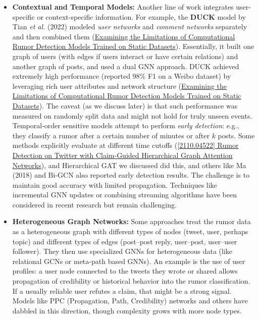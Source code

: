 \documentclass[12pt,a4paper]{report}
\begin{document}
\begin{itemize}[leftmargin=1.2cm]
    \item \textbf{Contextual and Temporal Models:} Another line of work integrates user-specific or context-specific information. For example, the \textbf{DUCK} model by Tian \textit{et al.} (2022) modeled \textit{user networks} and \textit{comment networks} separately and then combined them (\href{https://arxiv.org/html/2309.11576v2#:~:text=DUCK%3A%20Rumour%20detection%20on%20social,Association%20for}{Examining the Limitations of Computational Rumor Detection Models Trained on Static Datasets}). Essentially, it built one graph of users (with edges if users interact or have certain relations) and another graph of posts, and used a dual GNN approach. DUCK achieved extremely high performance (reported 98\% F1 on a Weibo dataset) by leveraging rich user attributes and network structure (\href{https://arxiv.org/html/2309.11576v2#:~:text=Recent%20hybrid%20models%20began%20including,Ma}{Examining the Limitations of Computational Rumor Detection Models Trained on Static Datasets}). The caveat (as we discuss later) is that such performance was measured on randomly split data and might not hold for truly unseen events. Temporal-order sensitive models attempt to perform \textit{early detection}: e.g., they classify a rumor after a certain number of minutes or after \(k\) posts. Some methods explicitly evaluate at different time cutoffs (\href{https://ar5iv.org/pdf/2110.04522#:~:text=5}{[2110.04522] Rumor Detection on Twitter with Claim-Guided Hierarchical Graph Attention Networks}), and Hierarchical GAT we discussed did this, and others like Ma (2018) and Bi-GCN also reported early detection results. The challenge is to maintain good accuracy with limited propagation. Techniques like incremental GNN updates or combining streaming algorithms have been considered in recent research but remain challenging.
    \item \textbf{Heterogeneous Graph Networks:} Some approaches treat the rumor data as a heterogeneous graph with different types of nodes (tweet, user, perhaps topic) and different types of edges (post–post reply, user–post, user–user follower). They then use specialized GNNs for heterogeneous data (like relational GCNs or meta-path based GNNs). An example is the use of user profiles: a user node connected to the tweets they wrote or shared allows propagation of credibility or historical behavior into the rumor classification. If a usually reliable user refutes a claim, that might be a strong signal. Models like PPC (Propagation, Path, Credibility) networks and others have dabbled in this direction, though complexity grows with more node types.
\end{itemize}
\end{document}
